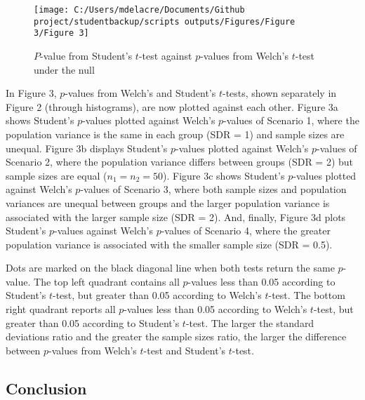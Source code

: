 \documentclass[
  english,
  man]{apa6}
\begin{document}
\begin{figure}

{\centering \texttt{[image: C:/Users/mdelacre/Documents/Github project/studentbackup/scripts outputs/Figures/Figure 3/Figure 3]} 

}

\caption{$P$-value from Student's $t$-test against $p$-values from Welch's $t$-test under the null}\label{fig:chp2fig3}
\end{figure}

In Figure 3, \(p\)-values from Welch's and Student's \(t\)-tests, shown separately in Figure 2 (through histograms), are now plotted against each other. Figure 3a shows Student's \(p\)-values plotted against Welch's \(p\)-values of Scenario 1, where the population variance is the same in each group (SDR = 1) and sample sizes are unequal. Figure 3b displays Student's \(p\)-values plotted against Welch's \(p\)-values of Scenario 2, where the population variance differs between groups (SDR = 2) but sample sizes are equal (\(n_1= n_2 = 50\)). Figure 3c shows Student's \(p\)-values plotted against Welch's \(p\)-values of Scenario 3, where both sample sizes and population variances are unequal between groups and the larger population variance is associated with the larger sample size (SDR = 2). And, finally, Figure 3d plots Student's \(p\)-values against Welch's \(p\)-values of Scenario 4, where the greater population variance is associated with the smaller sample size (SDR = 0.5).

Dots are marked on the black diagonal line when both tests return the same \(p\)-value. The top left quadrant contains all \(p\)-values less than 0.05 according to Student's \(t\)-test, but greater than 0.05 according to Welch's \(t\)-test. The bottom right quadrant reports all \(p\)-values less than 0.05 according to Welch's \(t\)-test, but greater than 0.05 according to Student's \(t\)-test. The larger the standard deviations ratio and the greater the sample sizes ratio, the larger the difference between \(p\)-values from Welch's \(t\)-test and Student's \(t\)-test.

\hypertarget{conclusion}{%
\subsection{Conclusion}\label{conclusion}}
\end{document}
